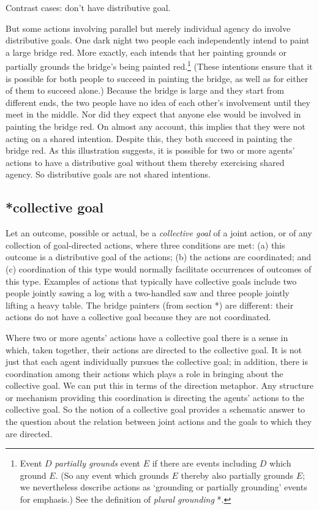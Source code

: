 \documentclass[12pt,\papersize]{extarticle}
\begin{document}
Contrast cases: don't have distributive goal.

But some actions involving parallel but merely individual agency do involve distributive goals.  
One dark night two people each independently intend to paint a large bridge red.   
More exactly, each intends that her painting grounds or partially grounds the bridge's being painted red.\footnote{
Event $D$ \emph{partially grounds} event $E$ if there are events including $D$ which ground $E$.
(So any event which grounds $E$ thereby also partially grounds $E$; 
we nevertheless describe actions as `grounding or partially grounding' events for emphasis.)
See the definition of \emph{plural grounding} *.
}  
(These intentions ensure that it is possible for both people to succeed in painting the bridge, as well as for either of them to succeed alone.)
Because the bridge is large and they start from different ends, the two people have no idea of each other's involvement until they meet in the middle.
Nor did they expect that anyone else would be involved in painting the bridge red.  
On almost any account, this implies that they were not acting on a shared intention.
Despite this, 
they both succeed in painting the bridge red. 
As this illustration suggests, 
it is possible for two or more agents' actions to have a distributive goal without them thereby exercising shared agency.
So distributive goals are not shared intentions.




\subsection{*collective goal}
Let an outcome, possible or actual, be a \emph{collective goal \label{df_collective_goal}} of a joint action, or of any collection of goal-directed actions, where three conditions are met: 
	(a) this outcome is a distributive goal of the actions; 
	(b) the actions are coordinated; and 
	(c)  coordination of this type would normally  facilitate occurrences of outcomes of this type.  
Examples of actions  that typically have collective goals include two people jointly sawing a log with a two-handled saw and  
three people jointly lifting a heavy table.
The bridge painters (from section *) are different: their actions do not have a collective goal because they are not coordinated.


Where two or more agents' actions have a collective goal there is a sense in which, taken together, their actions are directed to the collective goal.  
It is not just that each agent individually pursues the collective goal; in addition, there is coordination among their actions which plays a role in bringing about the collective goal.  
We can put this in terms of the direction metaphor.  
Any structure or mechanism providing this coordination is directing the agents' actions to the collective goal.  
So the notion of a collective goal provides a schematic answer to the question about the relation between joint actions and the goals to which they are directed.
\end{document}
